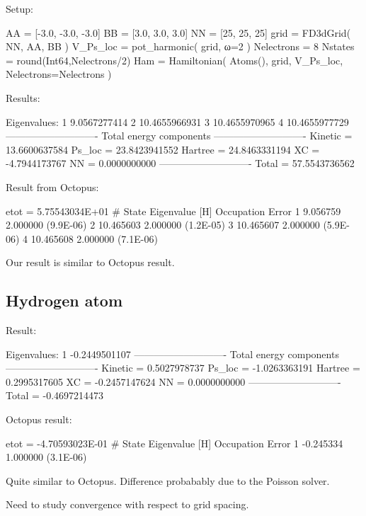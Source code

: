 Setup:
\begin{juliacode}
AA = [-3.0, -3.0, -3.0]
BB = [3.0, 3.0, 3.0]
NN = [25, 25, 25]
grid = FD3dGrid( NN, AA, BB )
V_Ps_loc = pot_harmonic( grid, ω=2 )
Nelectrons = 8
Nstates = round(Int64,Nelectrons/2)
Ham = Hamiltonian( Atoms(), grid, V_Ps_loc, Nelectrons=Nelectrons )
\end{juliacode}

Results:
\begin{textcode}
Eigenvalues:
 1       9.0567277414
 2      10.4655966931
 3      10.4655970965
 4      10.4655977729
----------------------------
Total energy components
----------------------------
Kinetic =      13.6600637584
Ps_loc  =      23.8423941552
Hartree =      24.8463331194
XC      =      -4.7944173767
NN      =       0.0000000000
----------------------------
Total   =      57.5543736562
\end{textcode}


Result from Octopus:
\begin{textcode}
etot  =  5.75543034E+01
#  State  Eigenvalue [H]  Occupation    Error
      1        9.056759    2.000000   (9.9E-06)
      2       10.465603    2.000000   (1.2E-05)
      3       10.465607    2.000000   (5.9E-06)
      4       10.465608    2.000000   (7.1E-06) 
\end{textcode}

Our result is similar to Octopus result.


\subsection{Hydrogen atom}

Result:
\begin{textcode}
Eigenvalues:
 1      -0.2449501107
----------------------------
Total energy components
----------------------------
Kinetic =       0.5027978737
Ps_loc  =      -1.0263363191
Hartree =       0.2995317605
XC      =      -0.2457147624
NN      =       0.0000000000
----------------------------
Total   =      -0.4697214473
\end{textcode}

Octopus result:
\begin{textcode}
 etot  = -4.70593023E-01
  #  State  Eigenvalue [H]  Occupation    Error
       1       -0.245334    1.000000   (3.1E-06)
\end{textcode}

Quite similar to Octopus.
Difference probabably due to the Poisson solver.

Need to study convergence with respect to grid spacing.

